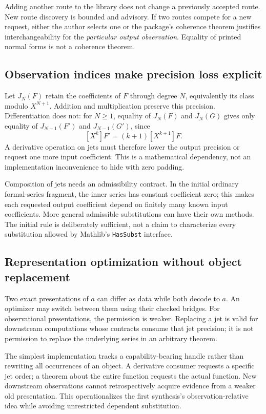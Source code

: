 \documentclass[11pt,letterpaper]{article}
\newcommand{\code}[1]{\nolinkurl{#1}}
\numberwithin{equation}{section}
\begin{document}
Adding another route to the library does not change a previously accepted route.
New route discovery is bounded and advisory. If two routes compete for a new
request, either the author selects one or the package's coherence theorem
justifies interchangeability for the \emph{particular output observation}.
Equality of printed normal forms is not a coherence theorem.

\subsection{Observation indices make precision loss explicit}
Let $J_N(F)$ retain the coefficients of $F$ through degree $N$, equivalently its
class modulo $X^{N+1}$. Addition and multiplication preserve this precision.
Differentiation does not: for $N\ge1$, equality of $J_N(F)$ and $J_N(G)$ gives
only equality of $J_{N-1}(F')$ and $J_{N-1}(G')$, since
\[
 [X^k]F'=(k+1)[X^{k+1}]F.
\]
A derivative operation on jets must therefore lower the output precision or
request one more input coefficient. This is a mathematical dependency, not
an implementation inconvenience to hide with zero padding.

Composition of jets needs an admissibility contract. In the initial ordinary
formal-series fragment, the inner series has constant coefficient zero; this
makes each requested output coefficient depend on finitely many known input
coefficients. More general admissible substitutions can have their own methods.
The initial rule is deliberately sufficient, not a claim to characterize every
substitution allowed by Mathlib's \code{HasSubst} interface.

\subsection{Representation optimization without object replacement}
Two exact presentations of $a$ can differ as data while both decode to $a$.
An optimizer may switch between them using their checked bridges. For
observational presentations, the permission is weaker. Replacing a jet is valid
for downstream computations whose contracts consume that jet precision; it is
not permission to replace the underlying series in an arbitrary theorem.

The simplest implementation tracks a capability-bearing handle rather than
rewriting all occurrences of an object. A derivative consumer requests a
specific jet order; a theorem about the entire function requests the actual
function. New downstream observations cannot retrospectively acquire evidence
from a weaker old presentation. This operationalizes the first synthesis's
observation-relative idea while avoiding unrestricted dependent substitution.
\end{document}
